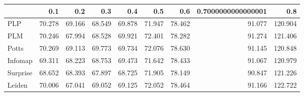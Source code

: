 \begin{tabular}{lrrrrrrrr}
\toprule
{} &    0.1 &    0.2 &    0.3 &    0.4 &    0.5 &    0.6 & 0.7000000000000001 &     0.8 \\
\midrule
PLP      & 70.278 & 69.166 & 68.549 & 69.878 & 71.947 & 78.462 &             91.077 & 120.904 \\
PLM      & 70.246 & 67.994 & 68.528 & 69.921 & 72.401 & 78.282 &             91.274 & 121.406 \\
Potts    & 70.269 & 69.113 & 69.773 & 69.734 & 72.076 & 78.630 &             91.145 & 120.848 \\
Infomap  & 69.311 & 68.223 & 68.753 & 69.473 & 71.642 & 78.433 &             91.067 & 120.979 \\
Surprise & 68.652 & 68.393 & 67.897 & 68.725 & 71.905 & 78.149 &             90.847 & 121.226 \\
Leiden   & 70.006 & 67.041 & 69.052 & 69.125 & 72.052 & 78.464 &             91.166 & 122.722 \\
\bottomrule
\end{tabular}
